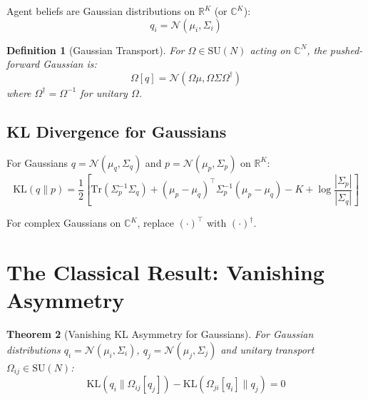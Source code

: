 \documentclass[11pt,a4paper]{article}
\newtheorem{theorem}{Theorem}[section]
\newtheorem{definition}[theorem]{Definition}
\newcommand{\KL}{\mathrm{KL}}
\newcommand{\Tr}{\mathrm{Tr}}
\newcommand{\SUN}{\mathrm{SU}(N)}
\newcommand{\Gauss}{\mathcal{N}}
\newcommand{\R}{\mathbb{R}}
\newcommand{\C}{\mathbb{C}}
\begin{document}
Agent beliefs are Gaussian distributions on $\R^K$ (or $\C^K$):
\begin{equation}
    q_i = \Gauss(\mu_i, \Sigma_i)
\end{equation}

\begin{definition}[Gaussian Transport]
For $\Omega \in \SUN$ acting on $\C^N$, the pushed-forward Gaussian is:
\begin{equation}
    \Omega[q] = \Gauss(\Omega \mu, \Omega \Sigma \Omega^\dagger)
\end{equation}
where $\Omega^\dagger = \Omega^{-1}$ for unitary $\Omega$.
\end{definition}

\subsection{KL Divergence for Gaussians}

For Gaussians $q = \Gauss(\mu_q, \Sigma_q)$ and $p = \Gauss(\mu_p, \Sigma_p)$ on $\R^K$:
\begin{equation}
    \KL(q \| p) = \frac{1}{2}\left[
        \Tr(\Sigma_p^{-1} \Sigma_q) +
        (\mu_p - \mu_q)^\top \Sigma_p^{-1} (\mu_p - \mu_q) -
        K +
        \log\frac{|\Sigma_p|}{|\Sigma_q|}
    \right]
\end{equation}

For complex Gaussians on $\C^K$, replace $(\cdot)^\top$ with $(\cdot)^\dagger$.

\section{The Classical Result: Vanishing Asymmetry}

\begin{theorem}[Vanishing KL Asymmetry for Gaussians]\label{thm:classical}
For Gaussian distributions $q_i = \Gauss(\mu_i, \Sigma_i)$, $q_j = \Gauss(\mu_j, \Sigma_j)$ and unitary transport $\Omega_{ij} \in \SUN$:
\begin{equation}
    \boxed{\KL(q_i \| \Omega_{ij}[q_j]) - \KL(\Omega_{ji}[q_i] \| q_j) = 0}
\end{equation}
\end{theorem}
\end{document}
